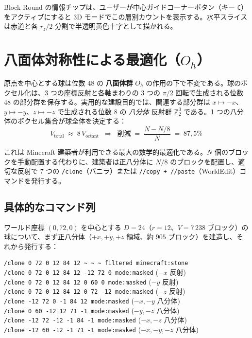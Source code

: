 \documentclass[12pt,a4paper]{scrartcl}
\newcommand{\code}[1]{\texttt{\small #1}}
\newcommand{\acc}[1]{\textcolor{accent}{\textbf{#1}}}
\newcommand{\cmd}[1]{\textcolor{earth}{\texttt{\small #1}}}
\begin{document}
Block Round の情報チップは、ユーザーが中心ガイドコーナーボタン（キー \code{C}）をアクティブにすると 3D モードでこの層別カウントを表示する。水平スライスは赤道と各 $r_z/2$ 分割で半透明黄色十字として描かれる。

\section{八面体対称性による最適化（$O_h$）}

原点を中心とする球は位数 $48$ の \acc{八面体群} $O_h$ の作用の下で不変である。球のボクセル化は、3 つの座標反射と各軸まわりの 3 つの $\pi/2$ 回転で生成される位数 $48$ の部分群を保存する。実用的な建設目的では、関連する部分群は $x \mapsto -x$、$y \mapsto -y$、$z \mapsto -z$ で生成される位数 $8$ の \emph{八分体} 反射群 $\mathbb{Z}_2^3$ である。1 つの八分体のボクセル集合が球全体を決定する：
\[
V_{\mathrm{total}} \;\approx\; 8\,V_{\mathrm{octant}}\;\;\Longrightarrow\;\;
\text{削減}\;=\;\frac{N - N/8}{N} \;=\; 87{,}5\%
\]

これは Minecraft 建築者が利用できる最大の数学的最適化である。$N$ 個のブロックを手動配置する代わりに、建築者は正八分体に $N/8$ のブロックを配置し、適切な反射で 7 つの \cmd{/clone}（バニラ）または \cmd{//copy + //paste}（WorldEdit）コマンドを発行する。

\subsection{具体的なコマンド列}
ワールド座標 $(0,72,0)$ を中心とする $D=24$（$r=12$、$V = 7\,238$ ブロック）の球について、まず正八分体（$+x, +y, +z$ 領域、約 $905$ ブロック）を建造し、それから発行する：

\begin{minec}
\cmd{/clone 0 72 0 12 84 12 \textasciitilde\,\textasciitilde\,\textasciitilde\ filtered minecraft:stone}\\
\cmd{/clone 0 72 0 12 84 12 -12 72 0 mode:masked} \quad ($-x$ 反射)\\
\cmd{/clone 0 72 0 12 84 12 0 60 0 mode:masked} \quad\quad ($-y$ 反射)\\
\cmd{/clone 0 72 0 12 84 12 0 72 -12 mode:masked} \quad ($-z$ 反射)\\
\cmd{/clone -12 72 0 -1 84 12 mode:masked} \quad\quad\quad\;\; ($-x,-y$ 八分体)\\
\cmd{/clone 0 60 -12 12 71 -1 mode:masked} \quad\quad\quad ($-y,-z$ 八分体)\\
\cmd{/clone -12 72 -12 -1 84 -1 mode:masked} \quad\;\; ($-x,-z$ 八分体)\\
\cmd{/clone -12 60 -12 -1 71 -1 mode:masked} \quad\;\; ($-x,-y,-z$ 八分体)
\end{minec}
\end{document}

